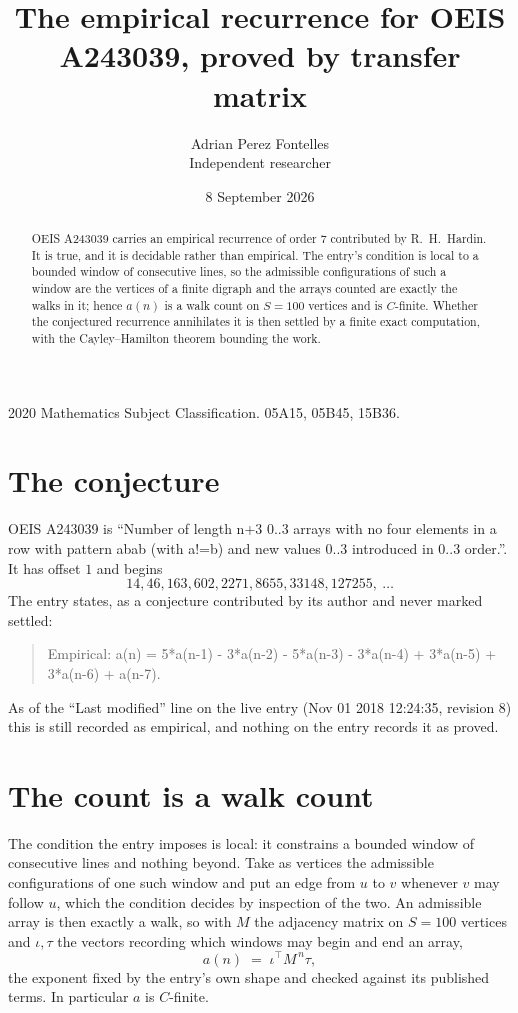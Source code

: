 \documentclass[11pt,a4paper]{article}
\title{The empirical recurrence for OEIS A243039, proved by transfer matrix}
\author{Adrian Perez Fontelles\\ \small Independent researcher}
\date{8 September 2026}
\theoremstyle{plain}
\theoremstyle{definition}
\begin{document}
\maketitle

\begin{abstract}
OEIS A243039 carries an empirical recurrence of order $7$ contributed by R.~H.~Hardin. It is
true, and it is decidable rather than empirical. The entry's condition is local to a bounded window of consecutive lines, so
the admissible configurations of such a window are the vertices of a finite digraph and the
arrays counted are exactly the walks in it; hence $a(n)$ is a walk count on $S=100$ vertices
and is $C$-finite. Whether the conjectured recurrence annihilates it is then settled by a
finite exact computation, with the Cayley--Hamilton theorem bounding the work.
\end{abstract}

\noindent\small 2020 Mathematics Subject Classification. 05A15, 05B45, 15B36.\normalsize

\section{The conjecture}

OEIS A243039 is ``Number of length n+3 0..3 arrays with no four elements in a row with pattern abab (with a!=b) and new values 0..3 introduced in 0..3 order.''. It has offset $1$ and begins
\[
14, 46, 163, 602, 2271, 8655, 33148, 127255,\ \dots
\]
The entry states, as a conjecture contributed by its author and never marked settled:
\begin{quote}
Empirical: a(n) = 5*a(n-1) - 3*a(n-2) - 5*a(n-3) - 3*a(n-4) + 3*a(n-5) + 3*a(n-6) + a(n-7).
\end{quote}
As of the ``Last modified'' line on the live entry (Nov 01 2018 12:24:35, revision 8) this is still
recorded as empirical, and nothing on the entry records it as proved.

\section{The count is a walk count}

The condition the entry imposes is local: it constrains a bounded window of consecutive lines and nothing beyond. Take as
vertices the admissible configurations of one such window and put an edge from $u$ to $v$
whenever $v$ may follow $u$, which the condition decides by inspection of the two. An
admissible array is then exactly a walk, so with $M$ the adjacency matrix on $S=100$ vertices
and $\iota,\tau$ the vectors recording which windows may begin and end an array,
\[
a(n)\;=\;\iota^{\!\top}M^{\,n}\tau ,
\]
the exponent fixed by the entry's own shape and checked against its published terms. In
particular $a$ is $C$-finite.
\end{document}
